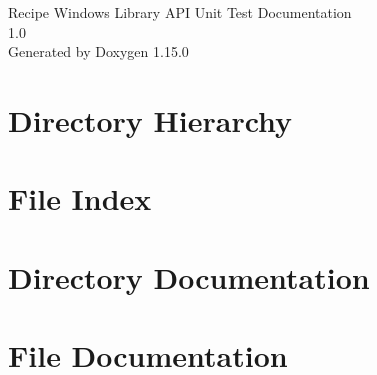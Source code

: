 \documentclass[twoside]{book}
\newcommand{\+}{\discretionary{\mbox{\scriptsize$\hookleftarrow$}}{}{}}
\newcommand{\clearemptydoublepage}{%
    \newpage{\pagestyle{empty}\cleardoublepage}%
  }
\begin{document}
  \raggedbottom
    \hypersetup{pageanchor=false,
                bookmarksnumbered=true,
                pdfencoding=unicode
               }
  \begin{titlepage}
  \vspace*{7cm}
  \begin{center}%
  {\Large Recipe Windows Library API Unit Test Documentation}\\
  [1ex]\large 1.\+0 \\
  \vspace*{1cm}
  {\large Generated by Doxygen 1.15.0}\\
  \end{center}
  \end{titlepage}
  \clearemptydoublepage
  \tableofcontents
  \clearemptydoublepage
  \hypersetup{pageanchor=true}

\chapter{Directory Hierarchy}

\chapter{File Index}

\chapter{Directory Documentation}

\chapter{File Documentation}





  \backmatter
  \newpage
  \clearemptydoublepage
  \printindex
\end{document}
